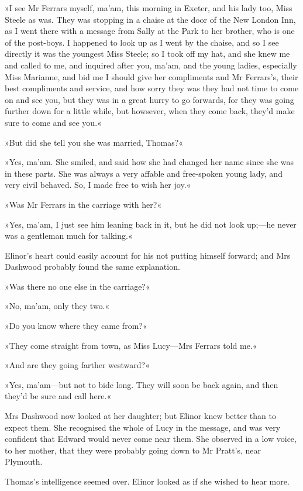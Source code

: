 »I see Mr Ferrars myself, ma’am, this morning in Exeter, and his lady too, Miss Steele as was. They was stopping in a chaise at the door of the New London Inn, as I went there with a message from Sally at the Park to her brother, who is one of the post-boys. I happened to look up as I went by the chaise, and so I see directly it was the youngest Miss Steele; so I took off my hat, and she knew me and called to me, and inquired after you, ma’am, and the young ladies, especially Miss Marianne, and bid me I should give her compliments and Mr Ferrars’s, their best compliments and service, and how sorry they was they had not time to come on and see you, but they was in a great hurry to go forwards, for they was going further down for a little while, but howsever, when they come back, they’d make sure to come and see you.«

»But did she tell you she was married, Thomas?«

»Yes, ma’am. She smiled, and said how she had changed her name since she was in these parts. She was always a very affable and free-spoken young lady, and very civil behaved. So, I made free to wish her joy.«

»Was Mr Ferrars in the carriage with her?«

»Yes, ma’am, I just see him leaning back in it, but he did not look up;—he never was a gentleman much for talking.«

Elinor’s heart could easily account for his not putting himself forward; and Mrs Dashwood probably found the same explanation.

»Was there no one else in the carriage?«

»No, ma’am, only they two.«

»Do you know where they came from?«

»They come straight from town, as Miss Lucy—Mrs Ferrars told me.«

»And are they going farther westward?«

»Yes, ma’am—but not to bide long. They will soon be back again, and then they’d be sure and call here.«

Mrs Dashwood now looked at her daughter; but Elinor knew better than to expect them. She recognised the whole of Lucy in the message, and was very confident that Edward would never come near them. She observed in a low voice, to her mother, that they were probably going down to Mr Pratt’s, near Plymouth.

Thomas’s intelligence seemed over. Elinor looked as if she wished to hear more.

